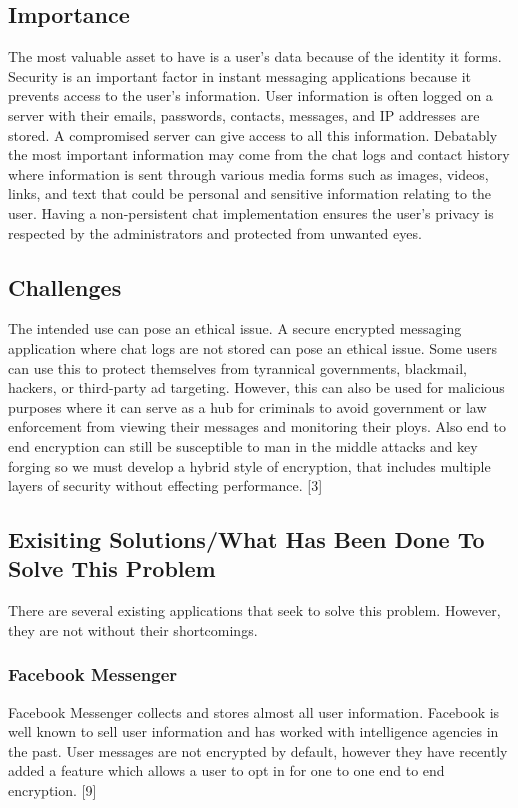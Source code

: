 \documentclass[11pt]{article}
\theoremstyle{plain}
\theoremstyle{definition}
\begin{document}
\subsection{Importance}\label{sec:importance}
The most valuable asset to have is a user’s data because of the identity it forms. Security is an important factor in instant messaging applications because it prevents access to the user’s information. User information is often logged on a server with their emails, passwords, contacts, messages, and IP addresses are stored. A compromised server can give access to all this information. Debatably the most important information may come from the chat logs and contact history where information is sent through various media forms such as images, videos, links, and text that could be personal and sensitive information relating to the user. Having a non-persistent chat implementation ensures the user’s privacy is respected by the administrators and protected from unwanted eyes.

\subsection{Challenges}\label{sec:challenges}
The intended use can pose an ethical issue. A secure encrypted messaging application where chat logs are not stored can pose an ethical issue. Some users can use this to protect themselves from tyrannical governments, blackmail, hackers, or third-party ad targeting. However, this can also be used for malicious purposes where it can serve as a hub for criminals to avoid government or law enforcement from viewing their messages and monitoring their ploys. Also end to end encryption can still be susceptible to man in the middle attacks and key forging so we must develop a hybrid style of encryption, that includes multiple layers of security without effecting performance. [3]

\subsection{Exisiting Solutions/What Has Been Done To Solve This Problem}\label{sec:exisitingsols}
There are several existing applications that seek to solve this problem. However, they are not without their shortcomings.
\subsubsection{Facebook Messenger}
Facebook Messenger collects and stores almost all user information. Facebook is well known to sell user information and has worked with intelligence agencies in the past. User messages are not encrypted by default, however they have recently added a feature which allows a user to opt in for one to one end to end encryption. [9]
\end{document}
